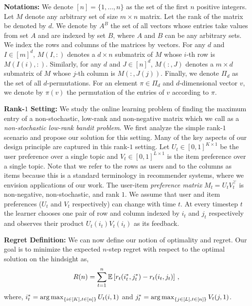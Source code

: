 
\newcommand{\transpose}{^\mathsf{\scriptscriptstyle T}}
\textbf{Notations:} We denote $[n] = \{1, \dots, n\}$ as the set of the first $n$ positive integers. Let $M$ denote any arbitrary set of size $m \times n$ matrix. Let the rank of the matrix be denoted by $d$. We denote by $A^B$ the set of all vectors whose entries take values from set $A$ and are indexed by set $B$, where $A$ and $B$ can be any arbitrary sets. We index the rows and columns of the matrices by vectors. For any $d$ and $I \in [m]^d$, $M(I, :)$ denotes a $d \times n$ submatrix of $M$ whose $i$-th row is $M(I(i), :)$. Similarly, for any $d$ and $J \in [n]^d$, $M(:, J)$ denotes a $m \times d$ submatrix of $M$ whose $j$-th column is $M(:, J(j))$. Finally, we denote $\Pi_d$ as the set of all $d$-permutations. For an element $\pi \in \Pi_d$ and $d$-dimensional vector $v$, we denote by $\pi(v)$ the permutation of the entries of $v$ according to $\pi$.



\textbf{Rank-$1$ Setting:} We study the online learning problem of finding the maximum entry of a non-stochastic, low-rank and non-negative matrix which we call as a \emph{non-stochastic low-rank bandit problem}. We first analyze the simple rank-$1$ scenario and propose our solution for this setting. Many of the key aspects of our design principle are captured in this rank-$1$ setting. Let $U_t\in [0,1]^{K\times 1}$ be the user preference over a single topic and $V_t \in [0,1]^{L\times 1}$ is the item preference over a single topic. Note that we refer to the rows as users and to the columns as items because this is a standard terminology in recommender systems, where we envision applications of our work. The user-item \emph{preference matrix} $M_t = U_tV_t^{\intercal}$ is non-negative, non-stochastic, and rank $1$. We assume that user and item preferences ($U_t$ and $V_t$ respectively) can change with time $t$. At every timestep $t$ the learner chooses one pair of row and column indexed by $i_t$ and $j_t$ respectively and observes their product $U_t(i_t)V_t(i_t)$ as its feedback.

\textbf{Regret Definition:} We can now define our notion of optimality and regret.  Our goal is to minimize the expected $n$-step regret with respect to the optimal solution on the hindsight as,
\begin{align}
  R(n) =
  \sum_{t = 1}^n \mathbb{E}\left[r_t(i^\ast_t, j^\ast_t) - r_t(i_t,j_t)\right]\,,
  \label{eq:regret}
\end{align}
where, $i^\ast_t = \mathop{\rm arg\,max}_{\{i\in[K], t\in[n]\}}U_t(i,1)$ and  $j^\ast_t = \mathop{\rm arg\,max}_{\{j\in[L], t\in[n]\}}V_t(j,1)$.

